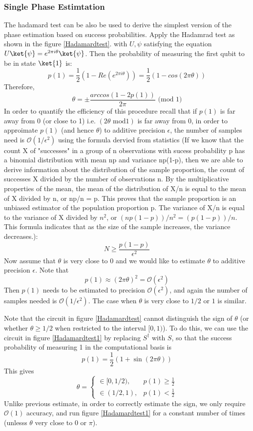 \documentclass[12pt, oneside]{book}
\theoremstyle{definition}
\theoremstyle{definition}
\theoremstyle{remark}
\begin{document}
\subsubsection{Single Phase Estimtation}
The hadamard test can be also be used to derive the simplest version of the phase estimation based on success probabilities.
Apply the Hadamrad test as shown in the figure \ref{Hadamardtest}. with $U,\psi$ satisfying the equation $U\ket{\psi}=e^{2\pi i \theta}\ket{\psi}$.
Then the probability of measuring the first qubit to be in state $\ket{1}$ is:
\[
p(1)=\frac{1}{2}(1-Re(e^{2\pi i \theta}))=\frac{1}{2}(1-cos(2\pi \theta))
\]
Therefore,
\[
\theta=\pm\frac{arccos(1-2p(1))}{2\pi} \text{ (mod 1)}
\]
In order to quantify the efficiency of this procedure recall that if $p(1)$ is far away from 0 (or close to 1) i.e. 
$(2\theta \text{ mod} 1)$ is far away from 0, in order to approimate $p(1)$ (and hence $\theta$) to additive precision $\epsilon$, the
number of samples need is $\mathcal{O}(1/\epsilon^2)$ using the formula 
dervied from statistics (If we know that the count X of "successes" in a group of n 
observations with sucess probability p has a binomial distribution with mean np and 
variance np(1-p), then we are able to derive information about the distribution of 
the sample proportion, the count of successes X divided by the number of 
observations n. By the multiplicative properties of the mean, the mean of the 
distribution of X/n is equal to the mean of X divided by n, or np/n = p. This proves 
that the sample proportion  is an unbiased estimator of the population proportion p. 
The variance of X/n is equal to the variance of X 
divided by $n^2$, or $(np(1-p))/n^2 = (p(1-p))/n $. 
This formula indicates that as the size of the sample increases, the variance decreases.):
\[
    N\geq \frac{p(1-p)}{\epsilon^2}
\] 
Now assume that $\theta$ is very close to 0 and we would like to estimate $\theta$ 
to additive precision $\epsilon$. Note that 
\[
p(1)\approx (2\pi\theta)^2=\mathcal{O}(\epsilon^2)
\]
Then $p(1)$ needs to be estimated to precision $\mathcal{O}(\epsilon^2)$, and again the number of samples needed is $\mathcal{O}(1/\epsilon^2)$.
The case when $\theta$ is very close to $1/2$ or $1$ is similar.

Note that the circuit in figure \ref{Hadamardtest} cannot distinguish the sign of $\theta$ (or whether $\theta \geq 1/2$
when restricted to the interval $[0,1)$). To do this, we can use the circuit in figure \ref{Hadamardtest1}
by replacing $S^{\dagger}$ with $S$, so that the success probability of measuring 1 in the computational basis is
\[
p(1)=\frac{1}{2}(1+\sin (2\pi\theta))
\]
This gives
\[
\theta = \begin{cases} \in [0,1/2), &p(1)\geq \frac{1}{2} \\ \in (1/2,1), & p(1)<\frac{1}{2}\end{cases}
\]
Unlike previous estimate, in order to correctly estimate the sign, we only require $\mathcal{O}(1)$ 
accuracy, and run figure \ref{Hadamardtest1} for a constant number of times (unlesss $\theta$ very close to $0$ or $\pi$).
\end{document}

